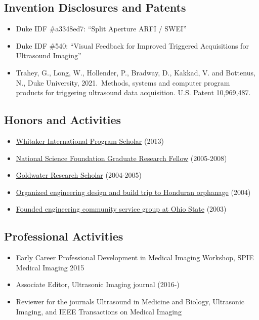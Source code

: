 \documentclass[
]{article}
\providecommand{\tightlist}{%
  \setlength{\itemsep}{0pt}\setlength{\parskip}{0pt}}
\begin{document}
\hypertarget{invention-disclosures-and-patents}{%
\subsection{Invention Disclosures and
Patents}\label{invention-disclosures-and-patents}}

\begin{itemize}
\tightlist
\item
  Duke IDF \#a3348ed7: ``Split Aperture ARFI / SWEI''
\item
  Duke IDF \#540: ``Visual Feedback for Improved Triggered Acquisitions
  for Ultrasound Imaging''
\item
  Trahey, G., Long, W., Hollender, P., Bradway, D., Kakkad, V. and
  Bottenus, N., Duke University, 2021.~Methods, systems and computer
  program products for triggering ultrasound data acquisition. U.S.
  Patent 10,969,487.
\end{itemize}

\hypertarget{honors-and-activities}{%
\subsection{Honors and Activities}\label{honors-and-activities}}

\begin{itemize}
\tightlist
\item
  \href{http://www.whitaker.org/grants/fellows-scholars}{Whitaker
  International Program Scholar} (2013)
\item
  \href{http://www.nsfgrfp.org/}{National Science Foundation Graduate
  Research Fellow} (2005-2008)
\item
  \href{https://goldwater.scholarsapply.org/}{Goldwater Research
  Scholar} (2004-2005)
\item
  \href{http://www.montanadeluz.org/}{Organized engineering design and
  build trip to Honduran orphanage} (2004)
\item
  \href{http://ecos.osu.edu/}{Founded engineering community service
  group at Ohio State} (2003)
\end{itemize}

\hypertarget{professional-activities}{%
\subsection{Professional Activities}\label{professional-activities}}

\begin{itemize}
\tightlist
\item
  Early Career Professional Development in Medical Imaging Workshop,
  SPIE Medical Imaging 2015
\item
  Associate Editor, Ultrasonic Imaging journal (2016-)
\item
  Reviewer for the journals Ultrasound in Medicine and Biology,
  Ultrasonic Imaging, and IEEE Transactions on Medical Imaging
\end{itemize}
\end{document}
